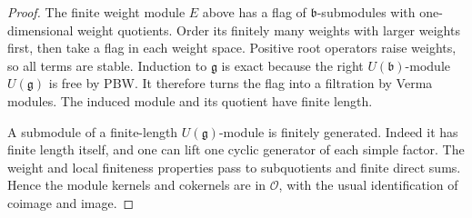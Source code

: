 \documentclass[11pt,oneside,openany]{book}
\theoremstyle{definition}
\theoremstyle{remark}
\begin{document}
\begin{proof}
The finite weight module \(E\) above has a flag of
\(\mathfrak b\)-submodules with one-dimensional weight quotients.
Order its finitely many weights with larger weights first,
then take a flag in each weight space. Positive root operators
raise weights, so all terms are stable. Induction to
\(\mathfrak g\) is exact because the right \(U(\mathfrak b)\)-module
\(U(\mathfrak g)\) is free by PBW. It therefore turns the flag
into a filtration by Verma modules. The induced module and its
quotient have finite length.

A submodule of a finite-length \(U(\mathfrak g)\)-module is finitely
generated. Indeed it has finite length itself, and one can lift
one cyclic generator of each simple factor. The weight and local
finiteness properties pass to subquotients and finite direct sums.
Hence the module kernels and cokernels are in \(\mathcal O\),
with the usual identification of coimage and image.
\end{proof}
\end{document}
